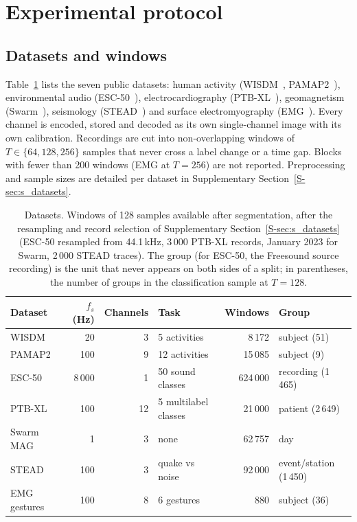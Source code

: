 \documentclass[preprint,review,12pt]{elsarticle}
\begin{document}
\section{Experimental protocol}\label{sec:protocol}

\subsection{Datasets and windows}
Table~\ref{tab:datasets} lists the seven public datasets: human activity (WISDM~\cite{misc_wisdm_smartphone_and_smartwatch_activity_and_biometrics_dataset__507}, PAMAP2~\cite{reiss2012pamap2}), environmental audio (ESC-50~\cite{piczak2015esc}), electrocardiography (PTB-XL~\cite{wagner2020ptbxl}), geomagnetism (Swarm~\cite{friis2006swarm}), seismology (STEAD~\cite{mousavi2019stead}) and surface electromyography (EMG~\cite{krilova2018emg}). Every channel is encoded, stored and decoded as its own single-channel image with its own calibration. Recordings are cut into non-overlapping windows of $T\in\{64,128,256\}$ samples that never cross a label change or a time gap. Blocks with fewer than 200 windows (EMG at $T=256$) are not reported. Preprocessing and sample sizes are detailed per dataset in Supplementary Section~\ref{S-sec:s_datasets}.

\begin{table}[H]
\centering
\caption{Datasets. Windows of 128 samples available after segmentation, after the resampling and record selection of Supplementary Section~\ref{S-sec:s_datasets} (ESC-50 resampled from 44.1\,kHz, 3\,000 PTB-XL records, January 2023 for Swarm, 2\,000 STEAD traces). The group (for ESC-50, the Freesound source recording) is the unit that never appears on both sides of a split; in parentheses, the number of groups in the classification sample at $T=128$.}\label{tab:datasets}
\footnotesize
\setlength{\tabcolsep}{4pt}
\begin{tabular}{@{}lrrlrl@{}}
\toprule
Dataset & $f_s$ (Hz) & Channels & Task & Windows & Group \\
\midrule
WISDM & 20 & 3 & 5 activities & 8\,172 & subject (51) \\
PAMAP2 & 100 & 9 & 12 activities & 15\,085 & subject (9) \\
ESC-50 & 8\,000 & 1 & 50 sound classes & 624\,000 & recording (1\,465) \\
PTB-XL & 100 & 12 & 5 multilabel classes & 21\,000 & patient (2\,649) \\
Swarm MAG & 1 & 3 & none & 62\,757 & day \\
STEAD & 100 & 3 & quake vs noise & 92\,000 & event/station (1\,450) \\
EMG gestures & 100 & 8 & 6 gestures & 880 & subject (36) \\
\bottomrule
\end{tabular}
\end{table}
\end{document}
